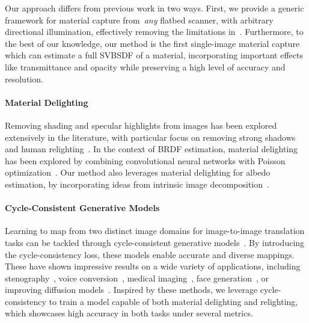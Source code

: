 Our approach differs from previous work in two ways. First, we provide a generic framework for material capture from~\emph{any} flatbed scanner, with arbitrary directional illumination, effectively removing the limitations in~\cite{rodriguezpardo2023UMat}. Furthermore, to the best of our knowledge, our method is the first single-image material capture which can estimate a full SVBSDF of a material, incorporating important effects like transmittance and opacity while preserving a high level of accuracy and resolution. 


\paragraph*{\textbf{Material Delighting}} Removing shading and specular highlights from images has been explored extensively in the literature, with particular focus on removing strong shadows~\cite{qu2017deshadownet,Vasluianu_2023_CVPR,Fu_2021_CVPR,Wang_2018_CVPR} and human relighting~\cite{lagunas2021single,yeh2022learning,wimbauer2022rendering,ji2022geometry}. In the context of BRDF estimation, material delighting has been explored by combining convolutional neural networks with Poisson optimization~\cite{martin2019lighting}. Our method also leverages material delighting for albedo estimation, by incorporating ideas from intrinsic image decomposition~\cite{garces2022survey}.

\paragraph*{\textbf{Cycle-Consistent Generative Models}} Learning to map from two distinct image domains for image-to-image translation tasks can be tackled through cycle-consistent generative models~\cite{zhu2017unpaired}. By introducing the cycle-consistency loss, these models enable accurate and diverse mappings. These have shown impressive results on a wide variety of applications, including stenography~\cite{chu2017cyclegan}, voice conversion~\cite{kaneko2019cyclegan}, medical imaging~\cite{yang2020unsupervised,harms2019paired}, face generation~\cite{lu2018attribute}, or improving diffusion models~\cite{wu2022unifying,su2022dual}. Inspired by these methods, we leverage cycle-consistency to train a model capable of both material delighting and relighting, which showcases high accuracy in both tasks under several metrics. 
